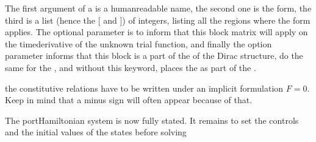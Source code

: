 \documentclass[letterpaper,10pt,english]{sphinxmanual}
\begin{document}
\begin{sphinxVerbatim}[commandchars=\\\{\}]
      \PYG{p}{[}\PYG{p}{]}
      \PYG{p}{[}\PYG{p}{]}
      \PYG{p}{[}\PYG{p}{]}
\PYG{p}{]}
   
\end{sphinxVerbatim}

\sphinxAtStartPar
The first argument of a  is a human\sphinxhyphen{}readable name, the second one
is the form, the third is a list (hence the {[} and {]}) of integers,
listing all the regions where the form applies. The optional parameter
 is to inform  that this block matrix will apply on
the time\sphinxhyphen{}derivative of the unknown trial function, and finally the
option parameter  informs  that this block
is a part of the  of the Dirac structure,
 do the same for the , and without
this keyword,  places the  as part of the .

\sphinxAtStartPar
{} the constitutive relations have to be written under
an implicit formulation \(F = 0\). Keep in mind that a minus sign
will often appear because of that.

\sphinxAtStartPar
The port\sphinxhyphen{}Hamiltonian system is now fully stated. It remains to set the
controls and the initial values of the states before solving
\end{document}
